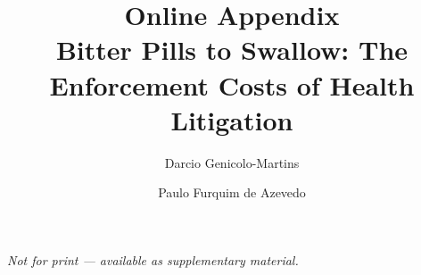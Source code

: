 \documentclass[a4paper,fleqn]{cas-sc}
\begin{document}
\let\WriteBookmarks\relax


\title[mode=title]{Online Appendix\\[4pt]
  \large Bitter Pills to Swallow: The Enforcement Costs of Health Litigation}

\author[1]{Darcio Genicolo-Martins}

\author[1]{Paulo Furquim de Azevedo}

\maketitle

\noindent\textit{Not for print --- available as supplementary material.}

\bigskip





\end{document}

